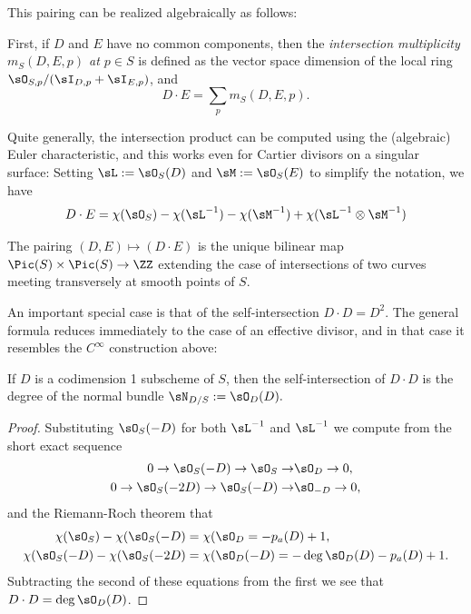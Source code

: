 This pairing can be realized algebraically as follows:

First, if $D$ and $E$ have no common
components, then the \emph{intersection multiplicity $m_S(D,E,p)$ at $p\in S$}
is defined as the vector space dimension of the local ring $\sO_{S,p}/(\sI_{D,p}+\sI_{E,p})$, and 
$$
D\cdot E = \sum_p m_S(D,E,p).
$$

Quite generally, 
the intersection product can be computed using the (algebraic) Euler characteristic, and this works even for Cartier divisors on a singular surface: Setting $\sL := \sO_S(D)$ and
$\sM := \sO_S(E)$ to simplify the notation, we have 
$$
D\cdot E = \chi(\sO_S)-\chi(\sL^{-1}) -\chi(\sM^{-1}) +\chi(\sL^{-1}\otimes \sM^{-1}) 
$$

\begin{theorem} The pairing $(D,E) \mapsto (D\cdot E)$ is the unique bilinear map
$\Pic(S) \times \Pic(S) \to \ZZ$ extending the case of intersections of two curves meeting transversely at smooth points of $S$. 
\end{theorem}

An important special case is that of the self-intersection $D\cdot D = D^2$. The general formula reduces immediately to the case of an effective divisor, and in that case it resembles the $C^{\infty}$ construction above:

\begin{corollary}\label{self-intersection number}
If $D$ is a codimension 1 subscheme of $S$, then the self-intersection of $D\cdot D$ is the degree of the normal bundle
$\sN_{D/S} := \sO_{D}(D).$
\end{corollary}

\begin{proof}
Substituting $\sO_{S}(-D)$ for both $\sL^{-1}$ and $\sL^{-1}$ we compute from the short exact sequence
\begin{align*}
 0\to \sO_{S}(-D)\to \sO_{S}\to &\sO_{D}\to 0,\\
0\to \sO_{S}(-2D)\to \sO_{S}(-D)\to &\sO_{-D}\to 0,
\end{align*}
and the Riemann-Roch theorem that
\begin{align*}
\chi(\sO_{S}) -\chi(\sO_{S}(-D) &= \chi(\sO_{D} = -p_{a}(D) +1,\\
\chi(\sO_{S}(-D) -\chi(\sO_{S}(-2D) &= \chi(\sO_{D}(-D) = -\deg \sO_{D}(D) - p_{a}(D) +1.\\
\end{align*}
Subtracting the second of these equations from the first we see that
$D\cdot D = \deg \sO_{D}(D)$.
\end{proof}

